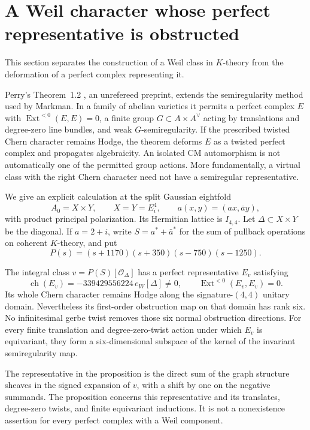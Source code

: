 \section{A Weil character whose perfect representative is obstructed}
\label{sec:equivariant-eightfolds}
This section separates the construction of a Weil class in $K$-theory from the deformation of a perfect complex representing it.

Perry's Theorem~1.2 \cite{Perry}, an unrefereed preprint, extends the semiregularity method used by Markman. In a family of abelian varieties it permits a perfect complex $E$ with $\operatorname{Ext}^{<0}(E,E)=0$, a finite group $G\subset A\times A^\vee$ acting by translations and degree-zero line bundles, and weak $G$-semiregularity. If the prescribed twisted Chern character remains Hodge, the theorem deforms $E$ as a twisted perfect complex and propagates algebraicity. An isolated CM automorphism is not automatically one of the permitted group actions. More fundamentally, a virtual class with the right Chern character need not have a semiregular representative.

We give an explicit calculation at the split Gaussian eightfold
\[
 A_0=X\times Y,
 \qquad X=Y=E_i^4,
 \qquad a(x,y)=(ax,\bar a y),
\]
with product principal polarization. Its Hermitian lattice is $I_{4,4}$. Let $\Delta\subset X\times Y$ be the diagonal. If $a=2+i$, write $S=a^*+\bar a^*$ for the sum of pullback operations on coherent $K$-theory, and put
\[
 P(s)=(s+1170)(s+350)(s-750)(s-1250).
\]

\begin{proposition}\label{prop:graph-obstruction}
The integral class $v=P(S)[\mathcal O_\Delta]$ has a perfect representative $E_v$ satisfying
\[
 \operatorname{ch}(E_v)=-339429556224\,e_W[\Delta]\ne0,
 \qquad \operatorname{Ext}^{<0}(E_v,E_v)=0.
\]
Its whole Chern character remains Hodge along the signature-$(4,4)$ unitary domain. Nevertheless its first-order obstruction map on that domain has rank six. No infinitesimal gerbe twist removes those six normal obstruction directions. For every finite translation and degree-zero-twist action under which $E_v$ is equivariant, they form a six-dimensional subspace of the kernel of the invariant semiregularity map.
\end{proposition}

The representative in the proposition is the direct sum of the graph structure sheaves in the signed expansion of $v$, with a shift by one on the negative summands. The proposition concerns this representative and its translates, degree-zero twists, and finite equivariant inductions. It is not a nonexistence assertion for every perfect complex with a Weil component.

